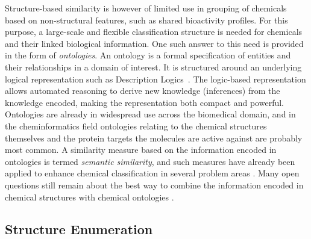 \documentclass{sig-alternate}
\begin{document}
%
Structure-based similarity is however of
limited use in grouping of chemicals based on non-structural features, such as
shared bioactivity profiles. For this purpose, a large-scale and flexible
classification structure is needed for chemicals and their linked biological
information. One such answer to this need is provided in the form of \emph{ontologies}.
An ontology is a formal specification of entities and their relationships in a
domain of interest. It is structured around an underlying logical representation
such as Description Logics~\cite{baaderdl2007}. The logic-based representation allows
automated reasoning to derive new knowledge (inferences) from the knowledge
encoded, making the representation both compact and powerful.
Ontologies are already in widespread use across the biomedical domain, and in the cheminformatics field ontologies
relating to the chemical structures themselves and the protein targets the molecules are active against are probably
most common. A
similarity measure based on the information encoded in ontologies is termed
\emph{semantic similarity}, and such measures have already been applied to enhance
chemical classification in several problem areas \cite{couto2010}. Many open
questions still remain about the best way to combine the information encoded in
chemical structures with chemical ontologies \cite{hastingsowled2010}.

\subsection{Structure Enumeration}
\label{sec:struct-enum}
\end{document}
